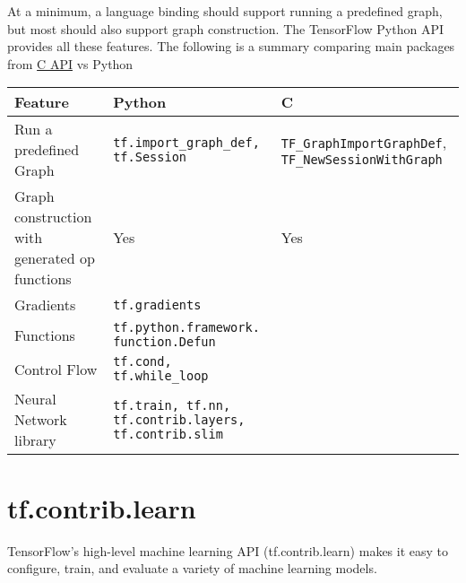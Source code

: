 \documentclass[11pt,a4paper]{article}
\begin{document}
At a minimum, a language binding should support running a predefined graph, but most should also support graph construction. The TensorFlow Python API provides all these features.
The following is a summary comparing main packages from \href{https://www.tensorflow.org/code/tensorflow/c/c_api.h}{C API} vs Python \\
\begin{tabular}{|p{3cm}|p{6cm}|p{5cm}|}
  \hline 
  \textbf{Feature} & \textbf{Python} & \textbf{C} \\ 
  \hline 
  Run a predefined Graph & \texttt{tf.import\_graph\_def, tf.Session} & \texttt{TF\_GraphImportGraphDef}, \texttt{TF\_NewSessionWithGraph} \\ 
  \hline 
  Graph construction with generated op functions & Yes & Yes \\ 
  \hline 
  Gradients & \texttt{tf.gradients} & \  \\ 
  \hline 
  Functions & \texttt{tf.python.framework. function.Defun} & \ \\ 
  \hline 
  Control Flow & \texttt{tf.cond, tf.while\_loop} & \ \\ 
  \hline 
  Neural Network library & \texttt{tf.train, tf.nn, tf.contrib.layers, tf.contrib.slim} & \ \\ 
  \hline 
  \end{tabular}   
  
\section{tf.contrib.learn}  
TensorFlow’s high-level machine learning API (tf.contrib.learn) makes it easy to configure, train, and evaluate a variety of machine learning models.
\end{document}
